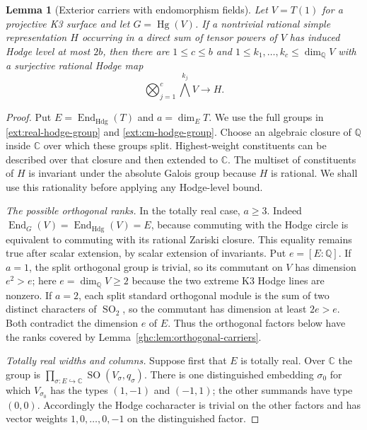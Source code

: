 \documentclass[11pt]{amsart}
\newcommand{\Q}{\mathbb Q}
\newcommand{\C}{\mathbb C}
\DeclareMathOperator{\End}{End}
\DeclareMathOperator{\SO}{SO}
\newtheorem{lemma}[theorem]{Lemma}
\theoremstyle{definition}
\theoremstyle{remark}
\numberwithin{equation}{section}
\begin{document}
\begin{lemma}[Exterior carriers with endomorphism fields]
\label{ghc:lem:k3-carriers}
Let $V=T(1)$ for a projective K3 surface and let
$G=\operatorname{Hg}(V)$.  If a nontrivial rational simple
representation $H$ occurring in a direct sum of tensor powers of
$V$ has induced Hodge level at most $2b$, then there are
$1\le c\le b$ and $1\le k_1,\ldots,k_c\le\dim_\Q V$ with a
surjective rational Hodge map
\[
 \bigotimes_{j=1}^c\bigwedge^{k_j}V\longrightarrow H.
\]
\end{lemma}
\begin{proof}
Put $E=\End_{\mathrm{Hdg}}(T)$ and $a=\dim_E T$.
We use the full groups in \eqref{ext:real-hodge-group} and
\eqref{ext:cm-hodge-group}.  Choose an algebraic closure of $\Q$
inside $\C$ over which these groups split.  Highest-weight
constituents can be described over that closure and then extended
to $\C$.  The multiset of constituents of $H$ is invariant under
the absolute Galois group because $H$ is rational.  We shall use
this rationality before applying any Hodge-level bound.

\emph{The possible orthogonal ranks.}
In the totally real case, $a\ge3$.  Indeed
$\End_G(V)=\End_{\mathrm{Hdg}}(V)=E$, because commuting with the
Hodge circle is equivalent to commuting with its rational Zariski
closure.  This equality remains true after scalar extension, by
scalar extension of invariants.  Put $e=[E:\Q]$.  If $a=1$, the
split orthogonal group is trivial, so its commutant on $V$ has
dimension $e^2>e$; here $e=\dim_\Q V\ge2$ because the two extreme
K3 Hodge lines are nonzero.  If $a=2$, each split standard orthogonal
module is the sum of two distinct characters of $\SO_2$, so the
commutant has dimension at least $2e>e$.  Both contradict the
dimension $e$ of $E$.  Thus the orthogonal factors below have the
ranks covered by Lemma~\ref{ghc:lem:orthogonal-carriers}.

\emph{Totally real widths and columns.}
Suppose first that $E$ is totally real.  Over $\C$ the group is
$\prod_{\sigma:E\hookrightarrow\C}\SO(V_\sigma,q_\sigma)$.
There is one distinguished embedding $\sigma_0$ for which
$V_{\sigma_0}$ has the types $(1,-1)$ and $(-1,1)$; the other
summands have type $(0,0)$.  Accordingly the Hodge cocharacter is
trivial on the other factors and has vector weights
$1,0,\ldots,0,-1$ on the distinguished factor.


\end{proof}
\end{document}
